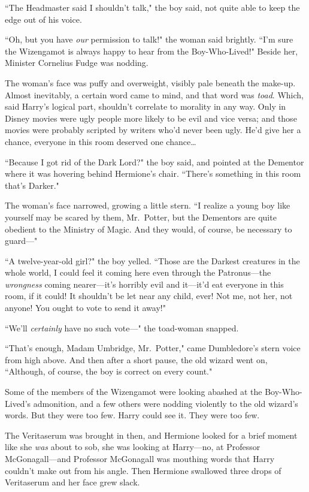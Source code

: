 ``The Headmaster said I shouldn't talk," the boy said, not quite able to keep the edge out of his voice.

``Oh, but you have \emph{our} permission to talk!" the woman said brightly. ``I'm sure the Wizengamot is always happy to hear from the Boy-Who-Lived!" Beside her, Minister Cornelius Fudge was nodding.

The woman's face was puffy and overweight, visibly pale beneath the make-up. Almost inevitably, a certain word came to mind, and that word was \emph{toad}. Which, said Harry's logical part, shouldn't correlate to morality in any way. Only in Disney movies were ugly people more likely to be evil and vice versa; and those movies were probably scripted by writers who'd never been ugly. He'd give her a chance, everyone in this room deserved one chance{\ldots}

``Because I got rid of the Dark Lord?" the boy said, and pointed at the Dementor where it was hovering behind Hermione's chair. ``There's something in this room that's Darker."

The woman's face narrowed, growing a little stern. ``I realize a young boy like yourself may be scared by them, Mr.~Potter, but the Dementors are quite obedient to the Ministry of Magic. And they would, of course, be necessary to guard—"

``A twelve-year-old girl?" the boy yelled. ``Those are the Darkest creatures in the whole world, I could feel it coming here even through the Patronus—the \emph{wrongness} coming nearer—it's horribly evil and it—it'd eat everyone in this room, if it could! It shouldn't be let near any child, ever! Not me, not her, not anyone! You ought to vote to send it away!"

``We'll \emph{certainly} have no such vote—" the toad-woman snapped.

``That's enough, Madam Umbridge, Mr.~Potter," came Dumbledore's stern voice from high above. And then after a short pause, the old wizard went on, ``Although, of course, the boy is correct on every count."

Some of the members of the Wizengamot were looking abashed at the Boy-Who-Lived's admonition, and a few others were nodding violently to the old wizard's words. But they were too few. Harry could see it. They were too few.

The Veritaserum was brought in then, and Hermione looked for a brief moment like she \emph{was} about to sob, she was looking at Harry—no, at Professor McGonagall—and Professor McGonagall was mouthing words that Harry couldn't make out from his angle. Then Hermione swallowed three drops of Veritaserum and her face grew slack.

